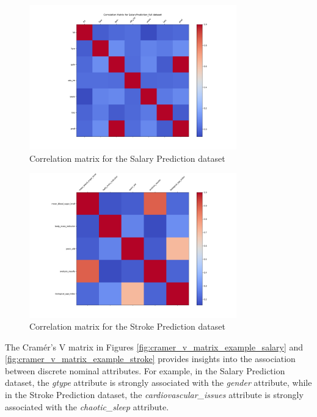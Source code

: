 \documentclass[runningheads]{paper}
\begin{document}
\begin{figure}[H]
    \centering
    \includegraphics[width=0.8\textwidth]{../plots/correlation_matrix_SalaryPrediction_full.png}
    \caption{Correlation matrix for the Salary Prediction dataset}
    \label{fig:correlation_matrix_example_salary}
\end{figure}

\begin{figure}[H]
    \centering
    \includegraphics[width=0.8\textwidth]{../plots/correlation_matrix_AVC_full.png}
    \caption{Correlation matrix for the Stroke Prediction dataset}
    \label{fig:correlation_matrix_example_stroke}
\end{figure}

The Cramér's V matrix in Figures \ref{fig:cramer_v_matrix_example_salary} and
\ref{fig:cramer_v_matrix_example_stroke} provides insights into the association
between discrete nominal attributes. For example, in the Salary Prediction dataset,
the \textit{gtype} attribute is strongly associated with the \textit{gender} attribute,
while in the Stroke Prediction dataset, the \textit{cardiovascular\_issues} attribute is strongly
associated with the \textit{chaotic\_sleep} attribute.
\end{document}
